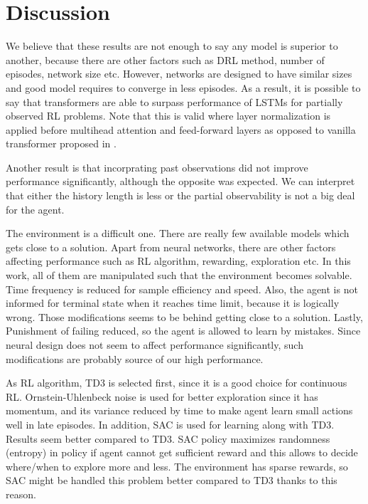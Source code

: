 \section{Discussion}
We believe that these results are not enough to say any model is superior to another, because there are other factors such as DRL method, number of episodes, network size etc. 
However, networks are designed to have similar sizes and good model requires to converge in less episodes. 
As a result, it is possible to say that transformers are able to surpass performance of LSTMs for partially observed RL problems. 
Note that this is valid where layer normalization is applied before multihead attention and feed-forward layers \cite{xiong_layer_2020} as opposed to vanilla transformer proposed in \cite{vaswani_attention_2017}. 

Another result is that incorprating past observations did not improve performance significantly, although the opposite was expected. 
We can interpret that either the history length is less or the partial observability is not a big deal for the agent. 

The environment is a difficult one. 
There are really few available models which gets close to a solution. 
Apart from neural networks, there are other factors affecting performance such as RL algorithm, rewarding, exploration etc. 
In this work, all of them are manipulated such that the environment becomes solvable. 
Time frequency is reduced for sample efficiency and speed. 
Also, the agent is not informed for terminal state when it reaches time limit, because it is logically wrong. Those modifications seems to be behind getting close to a solution. 
Lastly, Punishment of failing reduced, so the agent is allowed to learn by mistakes. 
Since neural design does not seem to affect performance significantly, such modifications are probably source of our high performance.

As RL algorithm, TD3 is selected first, since it is a good choice for continuous RL. 
Ornstein-Uhlenbeck noise is used for better exploration since it has momentum, and its variance reduced by time to make agent learn small actions well in late episodes. 
In addition, SAC is used for learning along with TD3. Results seem better compared to TD3. 
SAC policy maximizes randomness (entropy) in policy if agent cannot get sufficient reward and this allows to decide where/when to explore more and less. 
The environment has sparse rewards, so SAC might be handled this problem better compared to TD3 thanks to this reason.

